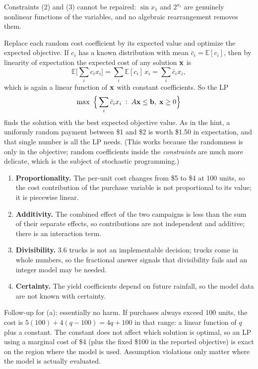Constraints (2) and (3) cannot be repaired: $\sin x_1$ and $2^{x_i}$ are genuinely nonlinear functions of the variables, and no algebraic rearrangement removes them.


Replace each random cost coefficient by its expected value and optimize the expected objective. If $c_i$ has a known distribution with mean $\bar{c}_i = \mathbb{E}[c_i]$, then by linearity of expectation the expected cost of any solution $\mathbf{x}$ is
\[
\mathbb{E}\Big[\sum_i c_i x_i\Big] = \sum_i \mathbb{E}[c_i]\, x_i = \sum_i \bar{c}_i x_i ,
\]
which is again a linear function of $\mathbf{x}$ with constant coefficients. So the LP
\[
\max\ \Big\{ \sum_i \bar{c}_i x_i \; : \; A\mathbf{x} \leq \mathbf{b}, \; \mathbf{x} \geq 0 \Big\}
\]
finds the solution with the best expected objective value. As in the hint, a uniformly random payment between \$1 and \$2 is worth \$1.50 in expectation, and that single number is all the LP needs. (This works because the randomness is only in the objective; random coefficients inside the \emph{constraints} are much more delicate, which is the subject of stochastic programming.)


\begin{enumerate}
\item \textbf{Proportionality.} The per-unit cost changes from \$5 to \$4 at 100 units, so the cost contribution of the purchase variable is not proportional to its value; it is piecewise linear.
\item \textbf{Additivity.} The combined effect of the two campaigns is less than the sum of their separate effects, so contributions are not independent and additive; there is an interaction term.
\item \textbf{Divisibility.} 3.6 trucks is not an implementable decision; trucks come in whole numbers, so the fractional answer signals that divisibility fails and an integer model may be needed.
\item \textbf{Certainty.} The yield coefficients depend on future rainfall, so the model data are not known with certainty.
\end{enumerate}
Follow-up for (a): essentially no harm. If purchases always exceed 100 units, the cost is $5(100) + 4(q - 100) = 4q + 100$ in that range: a linear function of $q$ plus a constant. The constant does not affect which solution is optimal, so an LP using a marginal cost of \$4 (plus the fixed \$100 in the reported objective) is exact on the region where the model is used. Assumption violations only matter where the model is actually evaluated.

